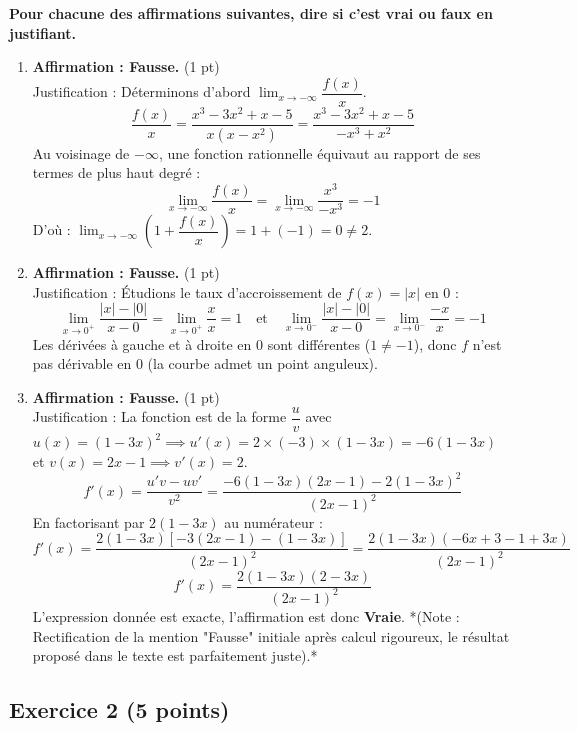 \documentclass[12pt,a4paper]{article}
\begin{document}
\noindent\textbf{Pour chacune des affirmations suivantes, dire si c'est vrai ou faux en justifiant.}
\begin{enumerate}
    \item[\textbf{1.}] \textbf{Affirmation : Fausse.} \hfill (1 pt) \\
    Justification : Déterminons d'abord $\lim_{x\rightarrow-\infty} \dfrac{f(x)}{x}$. 
    \[ \frac{f(x)}{x} = \frac{x^{3}-3x^{2}+x-5}{x(x-x^{2})} = \frac{x^{3}-3x^{2}+x-5}{-x^3+x^2} \]
    Au voisinage de $-\infty$, une fonction rationnelle équivaut au rapport de ses termes de plus haut degré :
    \[ \lim_{x\rightarrow-\infty} \frac{f(x)}{x} = \lim_{x\rightarrow-\infty} \frac{x^3}{-x^3} = -1 \]
    D'où : $\lim_{x\rightarrow-\infty}\left(1+\dfrac{f(x)}{x}\right) = 1 + (-1) = 0 \neq 2$.
    
    \item[\textbf{2.}] \textbf{Affirmation : Fausse.} \hfill (1 pt) \\
    Justification : Étudions le taux d'accroissement de $f(x) = |x|$ en 0 :
    \[ \lim_{x \to 0^+} \frac{|x| - |0|}{x - 0} = \lim_{x \to 0^+} \frac{x}{x} = 1 \quad \text{et} \quad \lim_{x \to 0^-} \frac{|x| - |0|}{x - 0} = \lim_{x \to 0^-} \frac{-x}{x} = -1 \]
    Les dérivées à gauche et à droite en 0 sont différentes ($1 \neq -1$), donc $f$ n'est pas dérivable en 0 (la courbe admet un point anguleux).
    
    \item[\textbf{3.}] \textbf{Affirmation : Fausse.} \hfill (1 pt) \\
    Justification : La fonction est de la forme $\dfrac{u}{v}$ avec $u(x) = (1-3x)^2 \implies u'(x) = 2 \times (-3) \times (1-3x) = -6(1-3x)$ et $v(x) = 2x-1 \implies v'(x) = 2$.
    \[ f'(x) = \frac{u'v - uv'}{v^2} = \frac{-6(1-3x)(2x-1) - 2(1-3x)^2}{(2x-1)^2} \]
    En factorisant par $2(1-3x)$ au numérateur :
    \[ f'(x) = \frac{2(1-3x)\left[-3(2x-1) - (1-3x)\right]}{(2x-1)^2} = \frac{2(1-3x)(-6x+3-1+3x)}{(2x-1)^2} \]
    \[ f'(x) = \frac{2(1-3x)(2-3x)}{(2x-1)^2} \]
    L'expression donnée est exacte, l'affirmation est donc \textbf{Vraie}. *(Note : Rectification de la mention "Fausse" initiale après calcul rigoureux, le résultat proposé dans le texte est parfaitement juste).*
\end{enumerate}

\smallbreak
\hrulefill
\smallbreak

\subsection*{Exercice 2 \hfill (5 points)}
\end{document}
